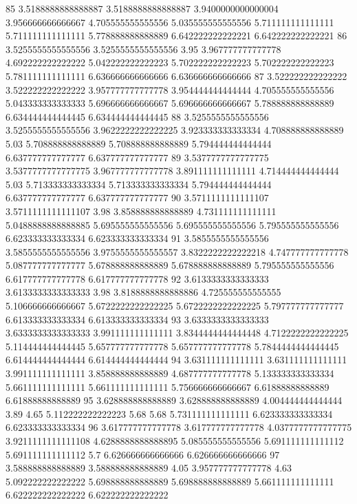 85 3.5188888888888887 3.5188888888888887 3.9400000000000004 3.956666666666667 4.705555555555556 5.035555555555556 5.711111111111111 5.711111111111111 5.778888888888889 6.642222222222221 6.642222222222221
86 3.5255555555555556 3.5255555555555556 3.95 3.967777777777778 4.692222222222222 5.042222222222223 5.702222222222223 5.702222222222223 5.781111111111111 6.636666666666666 6.636666666666666
87 3.522222222222222 3.522222222222222 3.957777777777778 3.954444444444444 4.705555555555556 5.043333333333333 5.696666666666667 5.696666666666667 5.788888888888889 6.634444444444445 6.634444444444445
88 3.5255555555555556 3.5255555555555556 3.9622222222222225 3.923333333333334 4.708888888888889 5.03 5.708888888888889 5.708888888888889 5.794444444444444 6.637777777777777 6.637777777777777
89 3.5377777777777775 3.5377777777777775 3.967777777777778 3.891111111111111 4.714444444444444 5.03 5.713333333333334 5.713333333333334 5.794444444444444 6.637777777777777 6.637777777777777
90 3.5711111111111107 3.5711111111111107 3.98 3.858888888888889 4.731111111111111 5.0488888888888885 5.695555555555556 5.695555555555556 5.795555555555556 6.623333333333334 6.623333333333334
91 3.5855555555555556 3.5855555555555556 3.9755555555555557 3.8322222222222218 4.747777777777778 5.087777777777777 5.678888888888889 5.678888888888889 5.795555555555556 6.617777777777778 6.617777777777778
92 3.6133333333333333 3.6133333333333333 3.98 3.8188888888888886 4.725555555555555 5.106666666666667 5.6722222222222225 5.6722222222222225 5.797777777777777 6.613333333333334 6.613333333333334
93 3.6333333333333333 3.6333333333333333 3.991111111111111 3.8344444444444448 4.7122222222222225 5.114444444444445 5.657777777777778 5.657777777777778 5.7844444444444445 6.614444444444444 6.614444444444444
94 3.631111111111111 3.631111111111111 3.991111111111111 3.858888888888889 4.687777777777778 5.133333333333334 5.661111111111111 5.661111111111111 5.756666666666667 6.61888888888889 6.61888888888889
95 3.628888888888889 3.628888888888889 4.004444444444444 3.89 4.65 5.112222222222223 5.68 5.68 5.731111111111111 6.623333333333334 6.623333333333334
96 3.617777777777778 3.617777777777778 4.0377777777777775 3.9211111111111108 4.6288888888888895 5.085555555555556 5.691111111111112 5.691111111111112 5.7 6.626666666666666 6.626666666666666
97 3.588888888888889 3.588888888888889 4.05 3.957777777777778 4.63 5.092222222222222 5.698888888888889 5.698888888888889 5.661111111111111 6.622222222222222 6.622222222222222
